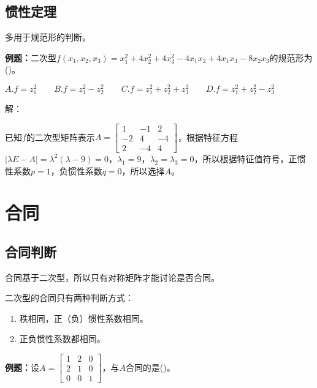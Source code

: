 \documentclass[UTF8, 12pt]{ctexart}
\begin{document}
\subsection{惯性定理}

多用于规范形的判断。

\textbf{例题：}二次型$f(x_1,x_2,x_3)=x_1^2+4x_2^2+4x_3^2-4x_1x_2+4x_1x_3-8x_2x_3$的规范形为()。

$A.f=z_1^2\qquad B.f=z_1^2-z_2^2\qquad C.f=z_1^2+z_2^2+z_3^2\qquad D.f=z_1^2+z_2^2-z_3^2$

解：

已知$f$的二次型矩阵表示$A=\left[\begin{array}{ccc}
    1 & -1 & 2 \\
    -2 & 4 & -4 \\
    2 & -4 & 4
\end{array}\right]$，根据特征方程$\vert\lambda E-A\vert=\lambda^2(\lambda-9)=0$，$\lambda_1=9$，$\lambda_2=\lambda_3=0$，所以根据特征值符号，正惯性系数$p=1$，负惯性系数$q=0$，所以选择$A$。

\section{合同}

\subsection{合同判断}

合同基于二次型，所以只有对称矩阵才能讨论是否合同。

二次型的合同只有两种判断方式：

\begin{enumerate}
    \item 秩相同，正（负）惯性系数相同。
    \item 正负惯性系数都相同。
\end{enumerate}

\textbf{例题：}设$A=\left[\begin{array}{ccc}
    1 & 2 & 0 \\
    2 & 1 & 0 \\
    0 & 0 & 1
\end{array}\right]$，与$A$合同的是()。
\end{document}
